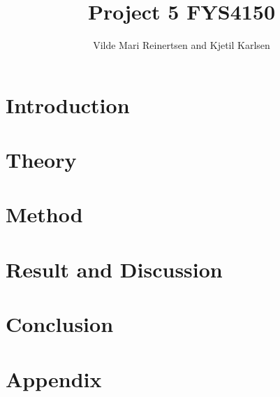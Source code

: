 



\title{Project 5 FYS4150}
\author{Vilde Mari Reinertsen and Kjetil Karlsen}
\raggedbottom



\maketitle

\pagestyle{fancy}



\begin{abstract}
\footnotesize






  
\tableofcontents
\end{abstract}


\section{Introduction}


\section{Theory}


\section{Method}


\section{Result and Discussion\label{sec:res}}


%

\section{Conclusion}


\newpage



\section*{Appendix}




